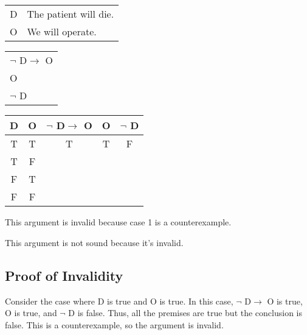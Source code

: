 \section{}
\centering
\begin{tabular}{r l}
    D & The patient will die. \\
    O & We will operate.
\end{tabular}
\begin{tabular}{l}
    $\lnot$ D$\rightarrow$ O\\
    O\\
    \hline
    $\lnot$ D
\end{tabular}

\begin{tabular}{c|c||c|c||c}
    D & O & $\lnot$ D$\rightarrow$ O & O & $\lnot$ D \\
    \hline
    T & T & T & T & F \\
    T & F &   &   &   \\
    F & T &   &   &   \\
    F & F &   &   &  
\end{tabular}

\justifying
\noindent This argument is invalid because case 1 is a counterexample.

\noindent This argument is not sound because it's invalid.

\subsection*{Proof of Invalidity}
Consider the case where D is true and O is true. In this case, $\lnot$ D$\rightarrow$ O is true, O is true, and $\lnot$ D is false. Thus, all the premises are true but the conclusion is false. This is a counterexample, so the argument is invalid.